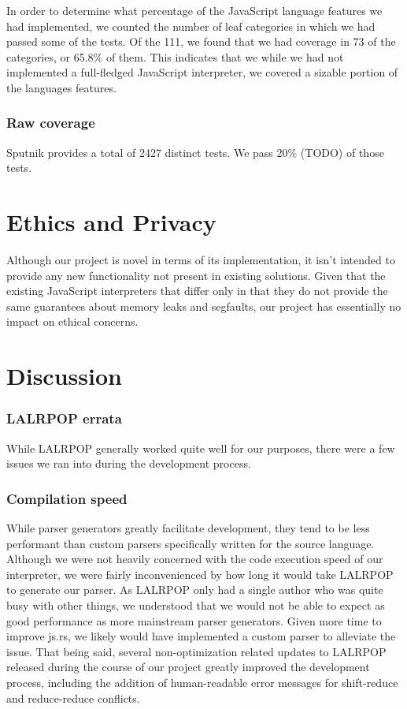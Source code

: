 \documentclass{article}
\begin{document}
\begin{multicols}{2}
In order to determine what percentage of the JavaScript language features we had
implemented, we counted the number of leaf categories in which we had passed
some of the tests. Of the 111, we found that we had coverage in 73 of the
categories, or 65.8\% of them. This indicates that we while we had not
implemented a full-fledged JavaScript interpreter, we covered a sizable portion
of the languages features.

\subsubsection*{Raw coverage}

Sputnik provides a total of 2427 distinct tests. We pass 20\% (TODO) of those
tests.

\section{Ethics and Privacy}

Although our project is novel in terms of its implementation, it isn't intended
to provide any new functionality not present in existing solutions. Given that
the existing JavaScript interpreters that differ only in that they do not
provide the same guarantees about memory leaks and segfaults, our project has
essentially no impact on ethical concerns.

\section{Discussion}

\subsubsection*{LALRPOP errata}

While LALRPOP generally worked quite well for our purposes, there were a few
issues we ran into during the development process.

\subsubsection*{Compilation speed}

While parser generators greatly facilitate development, they tend to be less
performant than custom parsers specifically written for the source language.
Although we were not heavily concerned with the code execution speed of our
interpreter, we were fairly inconvenienced by how long it would take LALRPOP to
generate our parser. As LALRPOP only had a single author who was quite busy with
other things, we understood that we would not be able to expect as good
performance as more mainstream parser generators. Given more time to improve
js.rs, we likely would have implemented a custom parser to alleviate the issue.
That being said, several non-optimization related updates to LALRPOP released
during the course of our project greatly improved the development process,
including the addition of human-readable error messages for shift-reduce and
reduce-reduce conflicts.


\end{multicols}
\end{document}
